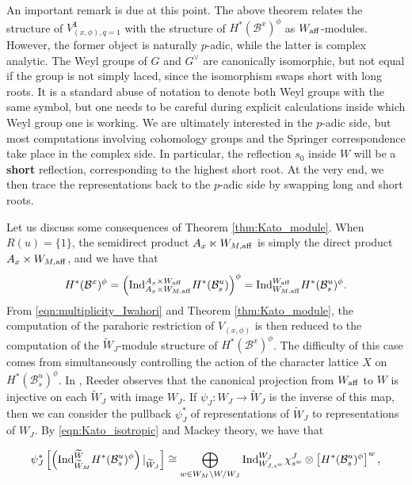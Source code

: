 \begin{remark}\label{rem:Weylgroups}
    An important remark is due at this point. The above theorem relates the structure of $V^\mathbf{1}_{(x,\phi),q=1}$ with the structure of $H^*(\mathcal{B}^x)^\phi$ as $W_{\mathrm{aff}}$-modules. However, the former object is naturally $p$-adic, while the latter is complex analytic. The Weyl groups of $G$ and $G^\vee$ are canonically isomorphic, but not equal if the group is not simply laced, since the isomorphism swaps short with long roots. It is a standard abuse of notation to denote both Weyl groups with the same symbol, but one needs to be careful during explicit calculations inside which Weyl group one is working. We are ultimately interested in the $p$-adic side, but most computations involving cohomology groups and the Springer correspondence take place in the complex side. In particular, the reflection $s_0$ inside $W$ will be a \textbf{short} reflection, corresponding to the highest short root. At the very end, we then trace the representations back to the $p$-adic side by swapping long and short roots. 
\end{remark}

Let us discuss some consequences of Theorem \ref{thm:Kato_module}. When $R(u)=\{1\}$, the semidirect product $A_x\ltimes W_{M,\mathrm{aff}}$ is simply the direct product $A_x\times W_{M,\mathrm{aff}}$, and we have that 
\begin{equation}\label{eqn:Kato_isotropic}
    H^*(\mathcal{B}^x)^\phi=\left(\mathrm{Ind}_{A_x\times W_{M,\mathrm{aff}}}^{A_x\times W_{\mathrm{aff}}}H^*(\mathcal{B}_s^u)\right)^\phi=\mathrm{Ind}_{W_{M,\mathrm{aff}}}^{W_{\mathrm{aff}}}H^*(\mathcal{B}_s^u)^\phi.
\end{equation}
From \eqref{eqn:multiplicity_Iwahori} and Theorem \ref{thm:Kato_module}, the computation of the parahoric restriction of $V_{(x,\phi)}$ is then reduced to the computation of the $\widetilde{W}_J$-module structure of $H^*(\mathcal{B}^x)^\phi$. The difficulty of this case comes from simultaneously controlling the action of the character lattice $X$ on $H^*(\mathcal{B}_s^u)^\phi$. In \cite{Reeder2000}, Reeder observes that the canonical projection from $W_{\mathrm{aff}}$ to $W$ is injective on each $\widetilde{W}_J$ with image $W_J$. If $\psi_J:W_J\rightarrow \widetilde{W}_J$ is the inverse of this map, then we can consider the pullback $\psi_J^*$ of representations of $\widetilde{W}_J$ to representations of $W_J$. By \eqref{eqn:Kato_isotropic} and Mackey theory, we have that 

\begin{equation}\label{eqn:mackey_generalcase}
    \psi_J^*\left[\left(\mathrm{Ind}_{\widetilde{W}_M}^{\widetilde{W}}H^*(\mathcal{B}^u_s)^\phi\right)|_{\widetilde{W}_J}\right]\cong\bigoplus_{w\in W_M\backslash W/W_J}\mathrm{Ind}_{W_{J,s^w}}^{W_J}\chi_{s^w}^J\otimes\left[H^*(\mathcal{B}^u_s)^\phi\right]^w,
\end{equation}

